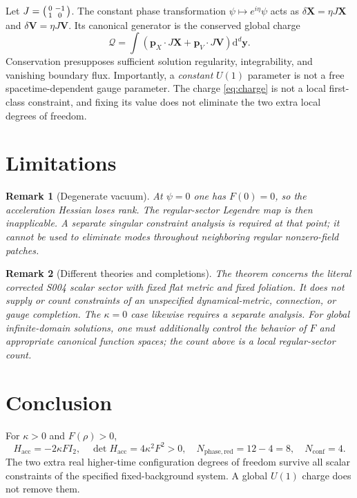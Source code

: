 \documentclass[11pt]{article}
\newtheorem{remark}{Remark}
\newcommand{\dd}{\mathrm{d}}
\newcommand{\bX}{\mathbf{X}}
\newcommand{\bV}{\mathbf{V}}
\newcommand{\bp}{\mathbf{p}}
\newcommand{\cQ}{\mathcal{Q}}
\begin{document}
Let $J=\begin{psmallmatrix}0&-1\\1&0\end{psmallmatrix}$.
The constant phase transformation $\psi\mapsto e^{i\eta}\psi$
acts as $\delta\bX=\eta J\bX$ and $\delta\bV=\eta J\bV$.
Its canonical generator is the conserved global charge
\begin{equation}\label{eq:charge}
\boxed{\cQ=\int\left(\bp_X\cdot J\bX
+\bp_V\cdot J\bV\right)\dd^d\mathbf y.}
\end{equation}
Conservation presupposes sufficient solution regularity, integrability,
and vanishing boundary flux. Importantly, a \emph{constant} $U(1)$
parameter is not a free spacetime-dependent gauge parameter. The charge
\eqref{eq:charge} is not a local first-class constraint, and fixing its
value does not eliminate the two extra local degrees of freedom.

\section{Limitations}

\begin{remark}[Degenerate vacuum]
At $\psi=0$ one has $F(0)=0$, so the acceleration Hessian loses rank.
The regular-sector Legendre map is then inapplicable. A separate singular
constraint analysis is required at that point; it cannot be used to
eliminate modes throughout neighboring regular nonzero-field patches.
\end{remark}

\begin{remark}[Different theories and completions]
The theorem concerns the literal corrected S004 scalar sector with
fixed flat metric and fixed foliation. It does not supply or count
constraints of an unspecified dynamical-metric, connection, or gauge
completion. The $\kappa=0$ case likewise requires a separate analysis.
For global infinite-domain solutions, one must additionally control
the behavior of $F$ and appropriate canonical function spaces; the
count above is a local regular-sector count.
\end{remark}

\section*{Conclusion}

For $\kappa>0$ and $F(\rho)>0$,
\begin{equation}
\boxed{H_{\mathrm{acc}}=-2\kappa F I_2,\quad
\det H_{\mathrm{acc}}=4\kappa^2F^2>0,\quad
N_{\mathrm{phase,red}}=12-4=8,\quad
N_{\mathrm{conf}}=4.}
\end{equation}
The two extra real higher-time configuration degrees of freedom survive
all scalar constraints of the specified fixed-background system. A
global $U(1)$ charge does not remove them.
\end{document}
